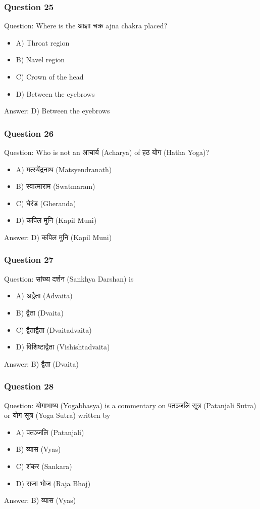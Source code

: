 \begin{frame}[fragile]\frametitle{Question 25}
Question: Where is the आज्ञा चक्र ajna chakra placed?
\begin{itemize}
\item A) Throat region
\item B) Navel region
\item C) Crown of the head
\item D) Between the eyebrows
\end{itemize}
Answer: D) Between the eyebrows
\end{frame}

\begin{frame}[fragile]\frametitle{Question 26}
Question: Who is not an आचार्य (Acharya) of हठ योग (Hatha Yoga)?
\begin{itemize}
\item A) मत्स्येंद्रनाथ (Matsyendranath)
\item B) स्वात्माराम (Swatmaram)
\item C) घेरंड (Gheranda)
\item D) कपिल मुनि (Kapil Muni)
\end{itemize}
Answer: D) कपिल मुनि (Kapil Muni)
\end{frame}

\begin{frame}[fragile]\frametitle{Question 27}
Question: सांख्य दर्शन (Sankhya Darshan) is
\begin{itemize}
\item A) अद्वैता (Advaita)
\item B) द्वैता (Dvaita)
\item C) द्वैताद्वैता (Dvaitadvaita)
\item D) विशिष्टाद्वैता (Vishishtadvaita)
\end{itemize}
Answer: B) द्वैता (Dvaita)
\end{frame}

\begin{frame}[fragile]\frametitle{Question 28}
Question: योगाभाष्य (Yogabhasya) is a commentary on पतञ्जलि सूत्र (Patanjali Sutra) or योग सूत्र (Yoga Sutra) written by
\begin{itemize}
\item A) पतञ्जलि (Patanjali)
\item B) व्यास (Vyas)
\item C) शंकर (Sankara)
\item D) राजा भोज (Raja Bhoj)
\end{itemize}
Answer: B) व्यास (Vyas)
\end{frame}


